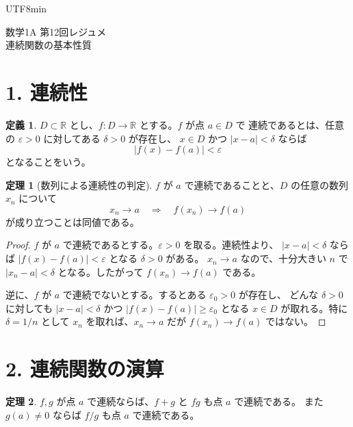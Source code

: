 \documentclass[a4paper,12pt]{article}
\begin{document}
\ifPDFTeX
\begin{CJK}{UTF8}{min}
\fi

\theoremstyle{definition}
\newtheorem*{definition}{定義}
\newtheorem*{theorem}{定理}
\newtheorem*{example}{例}
\newtheorem*{remark}{注意}
\renewcommand{\proofname}{\normalfont 証明}

\begin{center}
{\LARGE 数学1A 第12回レジュメ}\\[0.4em]
連続関数の基本性質
\end{center}

\section*{1. 連続性}

\begin{definition}
$D\subset\mathbb{R}$ とし、$f:D\to\mathbb{R}$ とする。$f$ が点 $a\in D$ で
連続であるとは、任意の $\varepsilon>0$ に対してある $\delta>0$ が存在し、
$x\in D$ かつ $|x-a|<\delta$ ならば
\[
|f(x)-f(a)|<\varepsilon
\]
となることをいう。
\end{definition}

\begin{theorem}[数列による連続性の判定]
$f$ が $a$ で連続であることと、$D$ の任意の数列 $x_n$ について
\[
x_n\to a\quad\Rightarrow\quad f(x_n)\to f(a)
\]
が成り立つことは同値である。
\end{theorem}

\begin{proof}
$f$ が $a$ で連続であるとする。$\varepsilon>0$ を取る。連続性より、
$|x-a|<\delta$ ならば $|f(x)-f(a)|<\varepsilon$ となる $\delta>0$ がある。
$x_n\to a$ なので、十分大きい $n$ で $|x_n-a|<\delta$ となる。したがって
$f(x_n)\to f(a)$ である。

逆に、$f$ が $a$ で連続でないとする。するとある $\varepsilon_0>0$ が存在し、
どんな $\delta>0$ に対しても $|x-a|<\delta$ かつ
$|f(x)-f(a)|\ge\varepsilon_0$ となる $x\in D$ が取れる。特に
$\delta=1/n$ として $x_n$ を取れば、$x_n\to a$ だが
$f(x_n)\to f(a)$ ではない。
\end{proof}

\section*{2. 連続関数の演算}

\begin{theorem}
$f,g$ が点 $a$ で連続ならば、$f+g$ と $fg$ も点 $a$ で連続である。
また $g(a)\ne0$ ならば $f/g$ も点 $a$ で連続である。
\end{theorem}


\end{CJK}
\end{document}
